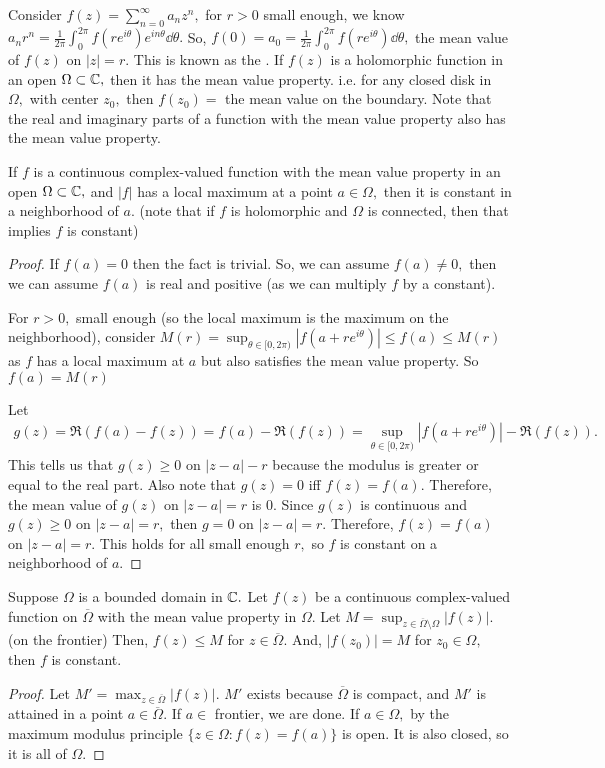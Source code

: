 \documentclass[a4paper,12pt]{article}
\begin{document}
Consider $f(z)=\sum_{n=0}^\infty a_nz^n,$ for $r>0$ small enough, we know $a_nr^n=\frac{1}{2\pi}\int_0^{2\pi}f(re^{i\theta})e^{in\theta}\dd\theta.$ So, $f(0)=a_0=\frac{1}{2\pi}\int_0^{2\pi}f(re^{i\theta})\dd\theta,$ the mean value of $f(z)$ on $|z|=r.$ This is known as the . If $f(z)$ is a holomorphic function in an open $\Omega\subset\mathbb{C},$ then it has the mean value property. i.e. for any closed disk in $\Omega,$ with center $z_0,$ then $f(z_0)=$ the mean value on the boundary. Note that the real and imaginary parts of a function with the mean value property also has the mean value property. \begin{theorem}
    If $f$ is a continuous complex-valued function with the mean value property in an open $\Omega\subset\mathbb{C},$ and $|f|$ has a local maximum at a point $a\in\Omega,$ then it is constant in a neighborhood of $a.$ (note that if $f$ is holomorphic and $\Omega$ is connected, then that implies $f$ is constant)
    \begin{proof}
        If $f(a)=0$ then the fact is trivial. So, we can assume $f(a)\neq0,$ then we can assume $f(a)$ is real and positive (as we can multiply $f$ by a constant).

        For $r>0,$ small enough (so the local maximum is the maximum on the neighborhood), consider $M(r)=\sup_{\theta\in[0,2\pi)}|f(a+re^{i\theta})|\leq f(a)\leq M(r)$ as $f$ has a local maximum at $a$ but also satisfies the mean value property. So $f(a)=M(r)$
        
        Let \begin{align}
            g(z)=\Re(f(a)-f(z))=f(a)-\Re(f(z))=\sup_{\theta\in[0,2\pi)}|f(a+re^{i\theta})|-\Re(f(z)).
        \end{align}
        This tells us that $g(z)\geq0$ on $|z-a|-r$ because the modulus is greater or equal to the real part. Also note that $g(z)=0$ iff $f(z)=f(a).$ Therefore, the mean value of $g(z)$ on $|z-a|=r$ is $0.$ Since $g(z)$ is continuous and $g(z)\geq0$ on $|z-a|=r,$ then $g=0$ on $|z-a|=r.$ Therefore, $f(z)=f(a)$ on $|z-a|=r.$ This holds for all small enough $r,$ so $f$ is constant on a neighborhood of $a.$
    \end{proof}
\end{theorem}
\begin{corollary}
    Suppose $\Omega$ is a bounded domain in $\mathbb{C}.$ Let $f(z)$ be a continuous complex-valued function on $\overline\Omega$ with the mean value property in $\Omega.$ Let $M=\sup_{z\in\overline\Omega\setminus\Omega}|f(z)|.$ (on the frontier) Then, $f(z)\leq M$ for $z\in\overline\Omega.$ And, $|f(z_0)|=M$ for $z_0\in\Omega,$ then $f$ is constant.
    \begin{proof}
        Let $M'=\max_{z\in\overline\Omega}|f(z)|.$ $M'$ exists because $\overline\Omega$ is compact, and $M'$ is attained in a point $a\in\overline\Omega.$ If $a\in$ frontier, we are done. If $a\in\Omega,$ by the maximum modulus principle $\{z\in\Omega:f(z)=f(a)\}$ is open. It is also closed, so it is all of $\Omega.$
    \end{proof}
\end{corollary}
\end{document}
